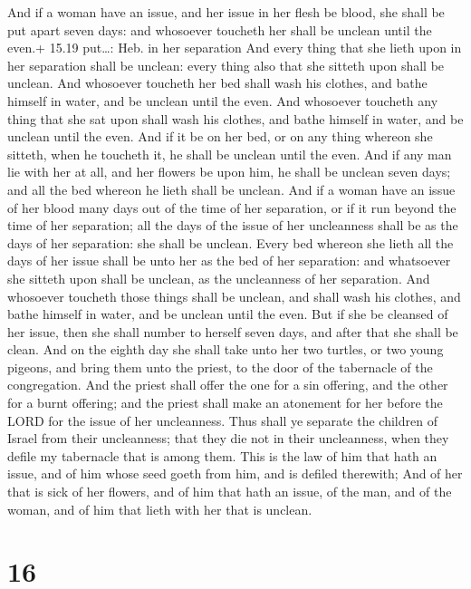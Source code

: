 And if a woman have an issue, and her issue in her flesh
be blood, she shall be put apart seven days: and whosoever toucheth her
shall be unclean until the even.+ 15.19 put\ldots: Heb. in her
separation  And every thing that she lieth upon in her
separation shall be unclean: every thing also that she sitteth upon
shall be unclean.  And whosoever toucheth her bed shall
wash his clothes, and bathe himself in water, and be unclean until the
even.  And whosoever toucheth any thing that she sat upon
shall wash his clothes, and bathe himself in water, and be unclean until
the even.  And if it be on her bed, or on any thing whereon
she sitteth, when he toucheth it, he shall be unclean until the even.
 And if any man lie with her at all, and her flowers be
upon him, he shall be unclean seven days; and all the bed whereon he
lieth shall be unclean.  And if a woman have an issue of
her blood many days out of the time of her separation, or if it run
beyond the time of her separation; all the days of the issue of her
uncleanness shall be as the days of her separation: she shall be
unclean.  Every bed whereon she lieth all the days of her
issue shall be unto her as the bed of her separation: and whatsoever she
sitteth upon shall be unclean, as the uncleanness of her separation.
 And whosoever toucheth those things shall be unclean, and
shall wash his clothes, and bathe himself in water, and be unclean until
the even.  But if she be cleansed of her issue, then she
shall number to herself seven days, and after that she shall be clean.
 And on the eighth day she shall take unto her two turtles,
or two young pigeons, and bring them unto the priest, to the door of the
tabernacle of the congregation.  And the priest shall offer
the one for a sin offering, and the other for a burnt offering; and the
priest shall make an atonement for her before the LORD for the issue of
her uncleanness.  Thus shall ye separate the children of
Israel from their uncleanness; that they die not in their uncleanness,
when they defile my tabernacle that is among them.  This is
the law of him that hath an issue, and of him whose seed goeth from him,
and is defiled therewith;  And of her that is sick of her
flowers, and of him that hath an issue, of the man, and of the woman,
and of him that lieth with her that is unclean.

\hypertarget{section-15}{%
\section{16}\label{section-15}}

